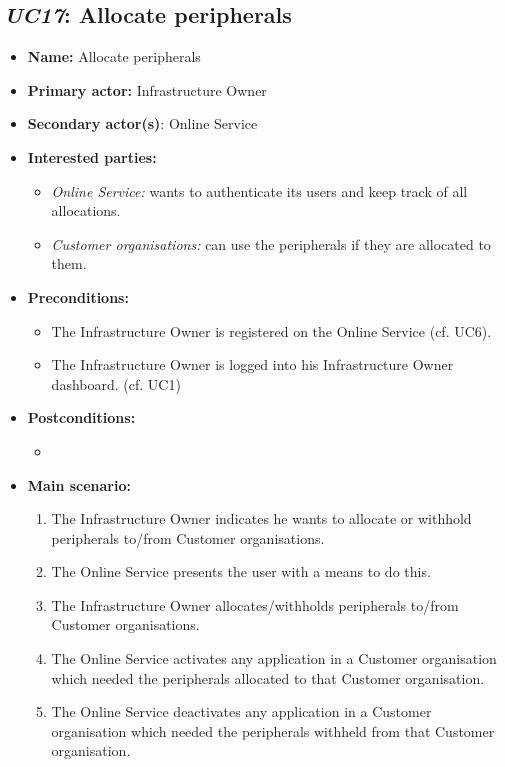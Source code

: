 \subsection{\emph{UC17}: Allocate peripherals}
\begin{itemize}
    \item \textbf{Name:} Allocate peripherals
    \item \textbf{Primary actor:} Infrastructure Owner
    \item \textbf{Secondary actor(s)}: Online Service
    \item \textbf{Interested parties:} 
        \begin{itemize}
             \item \textit{Online Service:}  wants to authenticate its users and keep track of all allocations.
             \item \textit{Customer organisations: } can use the peripherals if they are allocated to them.
        \end{itemize}

    \item \textbf{Preconditions:}
        \begin{itemize}
            \item The Infrastructure Owner is registered on the Online Service (cf. UC6).
            \item The Infrastructure Owner is logged into his Infrastructure Owner dashboard. (cf. UC1)
        \end{itemize}

    \item \textbf{Postconditions:}
        \begin{itemize}
            \item
        \end{itemize}

        
    \item \textbf{Main scenario:} 
    \begin{enumerate}
       \item The Infrastructure Owner indicates he wants to allocate or withhold peripherals to/from Customer organisations.
       \item The Online Service presents the user with a means to do this.
       \item The Infrastructure Owner allocates/withholds peripherals to/from Customer organisations.
       \item The Online Service activates any application in a Customer organisation which needed the peripherals allocated to that Customer organisation.
       \item The Online Service deactivates any application in a Customer organisation which needed the peripherals withheld from that Customer organisation.
    \end{enumerate}
\end{itemize}

